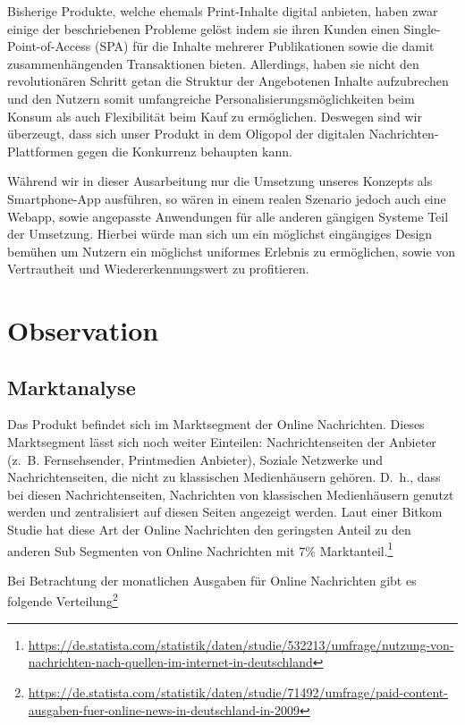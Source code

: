 Bisherige Produkte, welche ehemals Print-Inhalte digital anbieten, haben zwar einige der beschriebenen Probleme gelöst indem sie ihren Kunden einen Single-Point-of-Access (SPA) für die Inhalte mehrerer Publikationen sowie die damit zusammenhängenden Transaktionen bieten. Allerdings, haben sie nicht den revolutionären Schritt getan die Struktur der Angebotenen Inhalte aufzubrechen und den Nutzern somit umfangreiche Personalisierungsmöglichkeiten beim Konsum als auch Flexibilität beim Kauf zu ermöglichen. Deswegen sind wir überzeugt, dass sich unser Produkt in dem Oligopol der digitalen Nachrichten-Plattformen gegen die Konkurrenz behaupten kann.

Während wir in dieser Ausarbeitung nur die Umsetzung unseres Konzepts als Smartphone-App ausführen, so wären in einem realen Szenario jedoch auch eine Webapp, sowie angepasste Anwendungen für alle anderen gängigen Systeme Teil der Umsetzung. Hierbei würde man sich um ein möglichst eingängiges Design bemühen um Nutzern ein möglichst uniformes Erlebnis zu ermöglichen, sowie von Vertrautheit und Wiedererkennungswert zu profitieren.

\clearpage

\section{Observation}

\subsection{Marktanalyse}

Das Produkt befindet sich im Marktsegment der Online Nachrichten. Dieses Marktsegment lässt sich noch weiter Einteilen: Nachrichtenseiten der Anbieter (z.~B. Fernsehsender, Printmedien Anbieter), Soziale Netzwerke und Nachrichtenseiten, die nicht zu klassischen Medienhäusern gehören. D.~h., dass bei diesen Nachrichtenseiten, Nachrichten von klassischen Medienhäusern genutzt werden und zentralisiert auf diesen Seiten angezeigt werden. Laut einer Bitkom Studie hat diese Art der Online Nachrichten den geringsten Anteil zu den anderen Sub Segmenten von Online Nachrichten mit 7\% Marktanteil.\footnote{
  \begin{sloppypar}
    \url{https://de.statista.com/statistik/daten/studie/532213/umfrage/nutzung-von-nachrichten-nach-quellen-im-internet-in-deutschland}
  \end{sloppypar}
}

Bei Betrachtung der monatlichen Ausgaben für Online Nachrichten gibt es folgende Verteilung\footnote{
  \begin{sloppypar}
    \url{https://de.statista.com/statistik/daten/studie/71492/umfrage/paid-content-ausgaben-fuer-online-news-in-deutschland-in-2009}
  \end{sloppypar}
}


